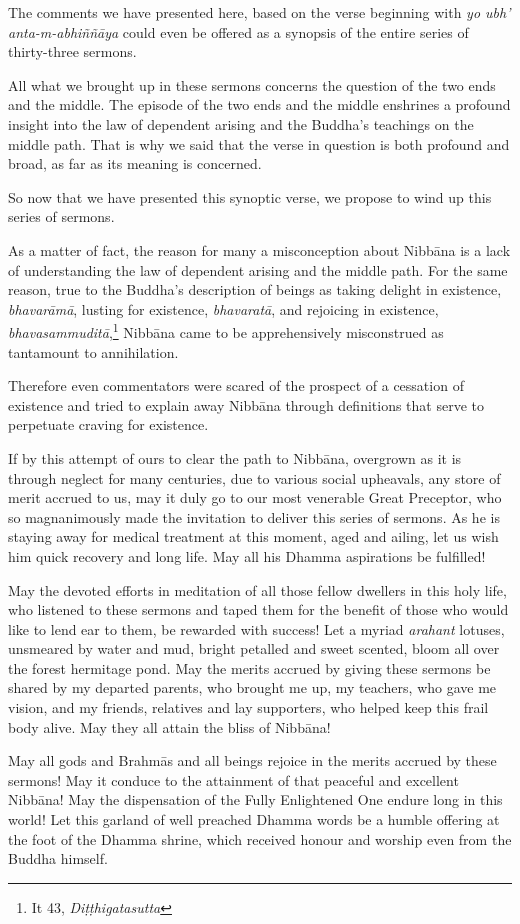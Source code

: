 The comments we have presented here, based on the verse beginning with \emph{yo ubh' anta-m-abhiññāya} could even be offered as a synopsis of the entire series of thirty-three sermons.

All what we brought up in these sermons concerns the question of the two ends and the middle. The episode of the two ends and the middle enshrines a profound insight into the law of dependent arising and the Buddha's teachings on the middle path. That is why we said that the verse in question is both profound and broad, as far as its meaning is concerned.

So now that we have presented this synoptic verse, we propose to wind up this series of sermons.

As a matter of fact, the reason for many a misconception about Nibbāna is a lack of understanding the law of dependent arising and the middle path. For the same reason, true to the Buddha's description of beings as taking delight in existence, \emph{bhavarāmā}, lusting for existence, \emph{bhavaratā}, and rejoicing in existence, \emph{bhavasammuditā},\footnote{It 43, \emph{Diṭṭhigatasutta}} Nibbāna came to be apprehensively misconstrued as tantamount to annihilation.

Therefore even commentators were scared of the prospect of a cessation of existence and tried to explain away Nibbāna through definitions that serve to perpetuate craving for existence.

If by this attempt of ours to clear the path to Nibbāna, overgrown as it is through neglect for many centuries, due to various social upheavals, any store of merit accrued to us, may it duly go to our most venerable Great Preceptor, who so magnanimously made the invitation to deliver this series of sermons. As he is staying away for medical treatment at this moment, aged and ailing, let us wish him quick recovery and long life. May all his Dhamma aspirations be fulfilled!

May the devoted efforts in meditation of all those fellow dwellers in this holy life, who listened to these sermons and taped them for the benefit of those who would like to lend ear to them, be rewarded with success! Let a myriad \emph{arahant} lotuses, unsmeared by water and mud, bright petalled and sweet scented, bloom all over the forest hermitage pond. May the merits accrued by giving these sermons be shared by my departed parents, who brought me up, my teachers, who gave me vision, and my friends, relatives and lay supporters, who helped keep this frail body alive. May they all attain the bliss of Nibbāna!

May all gods and Brahmās and all beings rejoice in the merits accrued by these sermons! May it conduce to the attainment of that peaceful and excellent Nibbāna! May the dispensation of the Fully Enlightened One endure long in this world! Let this garland of well preached Dhamma words be a humble offering at the foot of the Dhamma shrine, which received honour and worship even from the Buddha himself.
